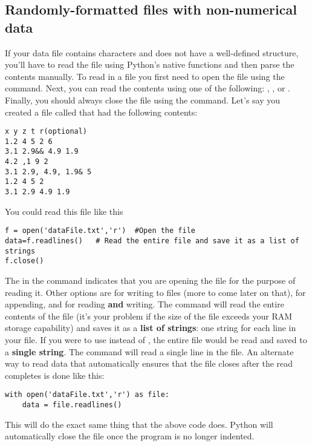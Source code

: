 \subsection*{Randomly-formatted files with non-numerical data}
If your data file contains characters and does not have a well-defined
structure, you'll have to read the file using Python's native
functions and then parse the contents manually.  To read in a file you
first need to open the file using the  command.  Next, you
can read the contents using one of the following: ,
, or .  Finally, you should always
close the file using the  command.  Let's say you created
a file called  that had the following contents:
\begin{Verbatim}
x y z t r(optional)
1.2 4 5 2 6
3.1 2.9&& 4.9 1.9
4.2 ,1 9 2
3.1 2.9, 4.9, 1.9& 5
1.2 4 5 2
3.1 2.9 4.9 1.9
\end{Verbatim}
You could read this file like this
\begin{Verbatim}
f = open('dataFile.txt','r')  #Open the file
data=f.readlines()   # Read the entire file and save it as a list of strings
f.close()
\end{Verbatim}
The  in the  command indicates that you are
opening the file for the purpose of reading it.  Other options are
 for writing to files (more to come later on that),
 for appending, and  for reading {\bf and}
writing.  The  command will read the entire contents
of the file (it's your problem if the size of the file exceeds your
RAM storage capability) and saves it as a {\bf list of strings}: one
string for each line in your file.  If you were to use 
instead of , the entire file would be read and saved
to a {\bf single string}.  The  command will read a
single line in the file.  An alternate way to read data that
automatically ensures that the file closes after the read completes is
done like this:
\begin{Verbatim}
with open('dataFile.txt','r') as file:
    data = file.readlines()
\end{Verbatim}
This will do the exact same thing that the above code does.  Python will automatically close the file once the program is no longer indented.

